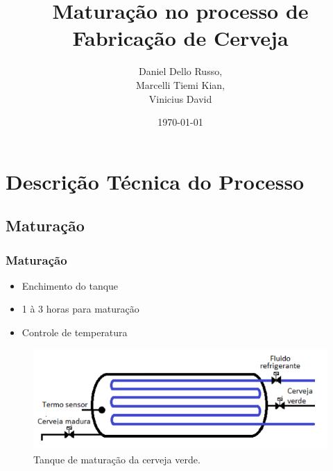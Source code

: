 \documentclass{beamer}
\title[Projeto 4]{Maturação no processo de Fabricação de Cerveja} %
\author{Daniel Dello Russo,\\ Marcelli Tiemi Kian,\\ Vinicius David} %
\institute[FEM] %
{
Universidade Estadual de Campinas \\ %
\medskip
\textit{} %
}
\date{\today} %
\begin{document}
\begin{frame}
\titlepage %
\end{frame}

\begin{frame}

\tableofcontents %
\end{frame}


\section{Descrição Técnica do Processo} 
\subsection{Maturação}
\begin{frame}
\frametitle{Maturação}
\begin{itemize}
	\item Enchimento do tanque
	\item 1 à 3 horas para maturação
	\item Controle de temperatura
\end{itemize}


	\begin{figure}[H]
		\centering
		\includegraphics [width=0.5\linewidth]{tanque.png}
		\caption {Tanque de maturação da cerveja verde.}
		\label{fig:maturador}
	\end{figure}
\end{frame}
\end{document}
